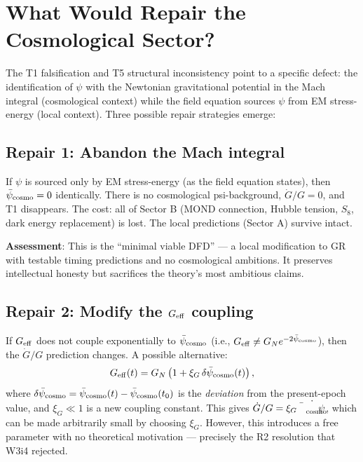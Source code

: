 \documentclass[11pt]{article}
\newcommand{\psicosmo}{\bar{\psi}_{\rm cosmo}}
\begin{document}
\section{What Would Repair the Cosmological Sector?}
\label{sec:repair}

The T1 falsification and T5 structural inconsistency point to a specific
defect: the identification of $\psi$ with the Newtonian gravitational
potential in the Mach integral (cosmological context) while the field
equation sources $\psi$ from EM stress-energy (local context). Three
possible repair strategies emerge:

\subsection{Repair 1: Abandon the Mach integral}

If $\psi$ is sourced only by EM stress-energy (as the field equation states),
then $\psicosmo = 0$ identically. There is no cosmological psi-background,
$\dot{G}/G = 0$, and T1 disappears. The cost: all of Sector B
(MOND connection, Hubble tension, $S_8$, dark energy replacement) is lost.
The local predictions (Sector A) survive intact.

\textbf{Assessment}: This is the ``minimal viable DFD'' --- a local modification
to GR with testable timing predictions and no cosmological ambitions. It
preserves intellectual honesty but sacrifices the theory's most ambitious claims.

\subsection{Repair 2: Modify the $G_{\rm eff}$ coupling}

If $G_{\rm eff}$ does not couple exponentially to $\psicosmo$ (i.e.,
$G_{\rm eff} \neq G_N e^{-2\psicosmo}$), then the $\dot{G}/G$ prediction
changes. A possible alternative:
\begin{equation}
G_{\rm eff}(t) = G_N\left(1 + \xi_G\,\delta\psicosmo(t)\right),
\label{eq:G-eff-linear}
\end{equation}
where $\delta\psicosmo = \psicosmo(t) - \psicosmo(t_0)$ is the \emph{deviation}
from the present-epoch value, and $\xi_G \ll 1$ is a new coupling constant.
This gives $\dot{G}/G = \xi_G\dot{\psicosmo}$, which can be made arbitrarily
small by choosing $\xi_G$. However, this introduces a free parameter with
no theoretical motivation --- precisely the R2 resolution that W3i4 rejected.
\end{document}
